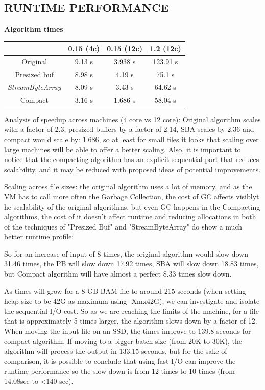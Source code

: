 \documentclass[a4paper,twoside]{article}
\begin{document}
\subsection{\uppercase{Runtime performance}}
\begin{small}
\par
\textbf{Algorithm times} \\
\vspace{-0.4cm}
\begin{center}
\begin{tabular}{|c|c|c|c|}
\hline
						& 0.15 (4c)		    & 0.15 (12c)		& 1.2 (12c) 			\\ \hline
Original				& 9.13 s			& 3.938 s			& 123.91 s			\\ \hline
Presized buf   			& 8.98 s			& 4.19 s			& 75.1 s	\\ \hline
{\it StreamByteArray}	& 8.09 s			& 3.43 s			& 64.62 s			\\ \hline
Compact 				& 3.16 s			& 1.686 s			& 58.04 s	\\ \hline
\end{tabular}
\end{center}
\end{small}

Analysis of speedup across machines (4 core vs 12 core):
Original algorithm scales with a factor of 2.3, presized buffers by a factor of 2.14, SBA scales by 2.36
and compact would scale by: 1.686, so at least for small files it looks that scaling over large machines will be able to offer a better scaling. Also, it is important to notice that the compacting algorithm has an explicit sequential part that reduces scalability, and it may be reduced with proposed ideas 
of potential improvements.

Scaling across file sizes: the original algorithm uses a lot of memory, and as the VM has to call more often the Garbage Collection, the cost of GC affects visiblyt he scalability of the original algorithms, but even GC happens in the Compacting algorithms, the cost of it doesn't affect runtime and reducing allocations in both of the techniques of "Presized Buf" and "StreamByteArray" do show a much better runtime profile:

So for an increase of input of 8 times, the original algorithm would slow down 31.46 times, the PB will slow down 17.92 times, SBA will slow down 18.83 times, but Compact algorithm will have almost a perfect 8.33 times slow down.

As times will grow for a 8 GB BAM file to around 215 seconds (when setting heap size to be 42G as maximum using -Xmx42G), we can investigate and isolate the sequential I/O cost. So as we are reaching the limits of the machine, for a file that is approximately 5 times larger, the algorithm slows down by a factor of 12. When moving the input file on an SSD, the times improve to 139.8 seconds for compact algorithm. If moving to a bigger batch size (from 20K to 30K), the algorithm will process the output in 133.15 seconds, but for the sake of comparison, it is possible to conclude that using fast I/O can improve the runtime performance so the slow-down is from 12 times to 10 times (from 14.08sec to <140 sec).
\end{document}
